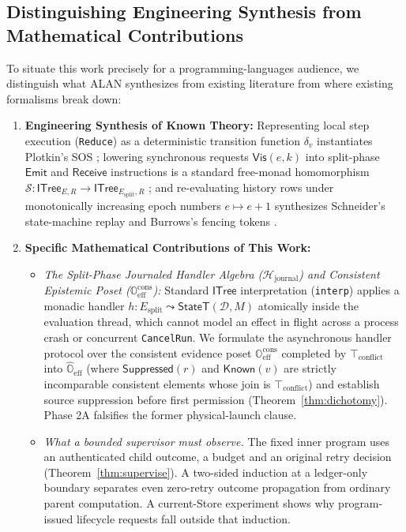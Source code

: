 \documentclass[11pt,a4paper]{article}
\theoremstyle{definition}
\theoremstyle{remark}
\newcommand{\ITree}{\mathsf{ITree}}
\begin{document}
\subsection{Distinguishing Engineering Synthesis from Mathematical Contributions}
To situate this work precisely for a programming-languages audience, we distinguish what ALAN synthesizes from existing literature from where existing formalisms break down:
\begin{enumerate}
  \item \textbf{Engineering Synthesis of Known Theory:} Representing local step execution (\texttt{Reduce}) as a deterministic transition function $\delta_v$ instantiates Plotkin's SOS \cite{plotkin1981structural}; lowering synchronous requests $\mathsf{Vis}(e, k)$ into split-phase $\mathsf{Emit}$ and $\mathsf{Receive}$ instructions is a standard free-monad homomorphism $\mathcal{S} : \ITree_{E,R} \to \ITree_{E_{\text{split}}, R}$ \cite{xia2020interaction}; and re-evaluating history rows under monotonically increasing epoch numbers $e \mapsto e+1$ synthesizes Schneider's state-machine replay \cite{schneider1990implementing} and Burrows's fencing tokens \cite{burrows2006chubby}.
  \item \textbf{Specific Mathematical Contributions of This Work:}
  \begin{itemize}
    \item \emph{The Split-Phase Journaled Handler Algebra ($\mathcal{H}_{\text{journal}}$) and Consistent Epistemic Poset ($\mathbb{O}_{\text{eff}}^{\text{cons}}$):} Standard $\ITree$ interpretation (\texttt{interp}) applies a monadic handler $h : E_{\text{split}} \leadsto \mathsf{StateT}(\mathcal{D}, M)$ atomically inside the evaluation thread, which cannot model an effect in flight across a process crash or concurrent \texttt{CancelRun}. We formulate the asynchronous handler protocol over the consistent evidence poset $\mathbb{O}_{\text{eff}}^{\text{cons}}$ completed by $\top_{\text{conflict}}$ into $\widehat{\mathbb{O}}_{\text{eff}}$ (where $\mathsf{Suppressed}(r)$ and $\mathsf{Known}(v)$ are strictly incomparable consistent elements whose join is $\top_{\text{conflict}}$) and establish source suppression before first permission (Theorem~\ref{thm:dichotomy}). Phase 2A falsifies the former physical-launch clause.
    \item \emph{What a bounded supervisor must observe.} The fixed inner program uses an authenticated child outcome, a budget and an original retry decision (Theorem~\ref{thm:supervise}). A two-sided induction at a ledger-only boundary separates even zero-retry outcome propagation from ordinary parent computation. A current-Store experiment shows why program-issued lifecycle requests fall outside that induction.

\end{itemize}
\end{enumerate}
\end{document}
